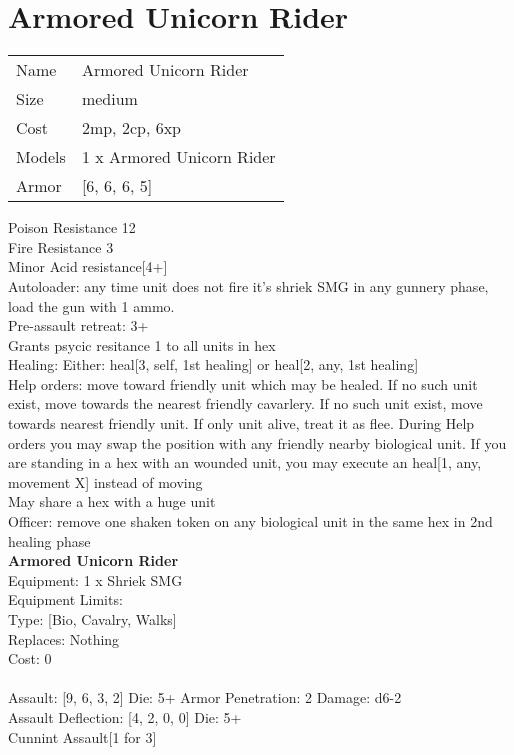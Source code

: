 \pagebreak\pagebreak

\section{ Armored Unicorn Rider }

\begin{tabular}{ll}
  Name & Armored Unicorn Rider \\
  Size & medium\\
  Cost & 2mp, 2cp, 6xp\\
  Models & 1 x Armored Unicorn Rider\\
  Armor & [6, 6, 6, 5]\\
\end{tabular}

\noindent Poison Resistance 12\\ 
Fire Resistance 3\\ 
Minor Acid resistance[4+]\\ 
Autoloader: any time unit does not fire it's shriek SMG in any gunnery phase, load the gun with 1 ammo.\\ 
Pre-assault retreat: 3+\\ 
Grants psycic resitance 1 to all units in hex\\ 
Healing: Either: heal[3, self, 1st healing] or heal[2, any, 1st healing]\\ 
Help orders: move toward friendly unit which may be healed. If no such unit exist, move towards the nearest friendly cavarlery. If no such unit exist, move towards nearest friendly unit. If only unit alive, treat it as flee. During Help orders you may swap the position with any friendly nearby biological unit. If you are standing in a hex with an wounded unit, you may execute an heal[1, any, movement X] instead of moving\\ 
May share a hex with a huge unit\\ 
Officer: remove one shaken token on any biological unit in the same hex in 2nd healing  phase\\ 


{\bf Armored Unicorn Rider } \\
Equipment: 1 x Shriek SMG \\
Equipment Limits:  \\
Type: [Bio, Cavalry, Walks] \\
Replaces: Nothing \\
Cost: 0\\
\ \\
Assault: [9, 6, 3, 2] Die: 5+ Armor Penetration: 2 Damage: d6-2 \\
Assault Deflection: [4, 2, 0, 0] Die: 5+\\
\indent Cunnint Assault[1 for 3]\\ 
 
